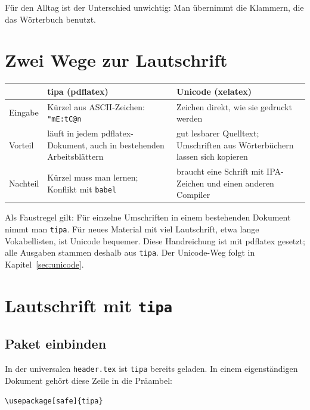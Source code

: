 Für den Alltag ist der Unterschied unwichtig: Man übernimmt die Klammern, die das Wörterbuch benutzt.



\section{Zwei Wege zur Lautschrift}

\begin{center}
\begin{tabular}{@{}l>{\raggedright\arraybackslash}p{6cm}>{\raggedright\arraybackslash}p{6cm}@{}}
	\toprule
	& \textbf{tipa} (pdflatex) & \textbf{Unicode} (xelatex) \\
	\midrule
	Eingabe & Kürzel aus ASCII-Zeichen: \texttt{"mE:tC@n} & Zeichen direkt, wie sie gedruckt werden \\
	Vorteil & läuft in jedem pdflatex-Dokument, auch in bestehenden Arbeitsblättern & gut lesbarer Quelltext; Umschriften aus Wörterbüchern lassen sich kopieren \\
	Nachteil & Kürzel muss man lernen; Konflikt mit \texttt{babel} & braucht eine Schrift mit IPA-Zeichen und einen anderen Compiler \\
	\bottomrule
\end{tabular}
\end{center}

Als Faustregel gilt: Für einzelne Umschriften in einem bestehenden Dokument nimmt man \texttt{tipa}. Für neues Material mit viel Lautschrift, etwa lange Vokabellisten, ist Unicode bequemer. Diese Handreichung ist mit pdflatex gesetzt; alle Ausgaben stammen deshalb aus \texttt{tipa}. Der Unicode-Weg folgt in Kapitel~\ref{sec:unicode}.



\section{Lautschrift mit \texttt{tipa}}


\subsection{Paket einbinden}

In der universalen \texttt{header.tex} ist \texttt{tipa} bereits geladen. In einem eigenständigen Dokument gehört diese Zeile in die Präambel:

\begin{lstlisting}[style=latex]
\usepackage[safe]{tipa}
\end{lstlisting}

